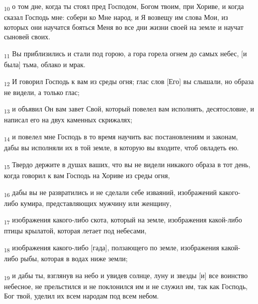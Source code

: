 \begin{tcolorbox}
\textsubscript{10} о том дне, когда ты стоял пред Господом, Богом твоим, при Хориве, и когда сказал Господь мне: собери ко Мне народ, и Я возвещу им слова Мои, из которых они научатся бояться Меня во все дни жизни своей на земле и научат сыновей своих.
\end{tcolorbox}
\begin{tcolorbox}
\textsubscript{11} Вы приблизились и стали под горою, а гора горела огнем до самых небес, [и была] тьма, облако и мрак.
\end{tcolorbox}
\begin{tcolorbox}
\textsubscript{12} И говорил Господь к вам из среды огня; глас слов [Его] вы слышали, но образа не видели, а только глас;
\end{tcolorbox}
\begin{tcolorbox}
\textsubscript{13} и объявил Он вам завет Свой, который повелел вам исполнять, десятословие, и написал его на двух каменных скрижалях;
\end{tcolorbox}
\begin{tcolorbox}
\textsubscript{14} и повелел мне Господь в то время научить вас постановлениям и законам, дабы вы исполняли их в той земле, в которую вы входите, чтоб овладеть ею.
\end{tcolorbox}
\begin{tcolorbox}
\textsubscript{15} Твердо держите в душах ваших, что вы не видели никакого образа в тот день, когда говорил к вам Господь на Хориве из среды огня,
\end{tcolorbox}
\begin{tcolorbox}
\textsubscript{16} дабы вы не развратились и не сделали себе изваяний, изображений какого-либо кумира, представляющих мужчину или женщину,
\end{tcolorbox}
\begin{tcolorbox}
\textsubscript{17} изображения какого-либо скота, который на земле, изображения какой-либо птицы крылатой, которая летает под небесами,
\end{tcolorbox}
\begin{tcolorbox}
\textsubscript{18} изображения какого-либо [гада], ползающего по земле, изображения какой-либо рыбы, которая в водах ниже земли;
\end{tcolorbox}
\begin{tcolorbox}
\textsubscript{19} и дабы ты, взглянув на небо и увидев солнце, луну и звезды [и] все воинство небесное, не прельстился и не поклонился им и не служил им, так как Господь, Бог твой, уделил их всем народам под всем небом.
\end{tcolorbox}
